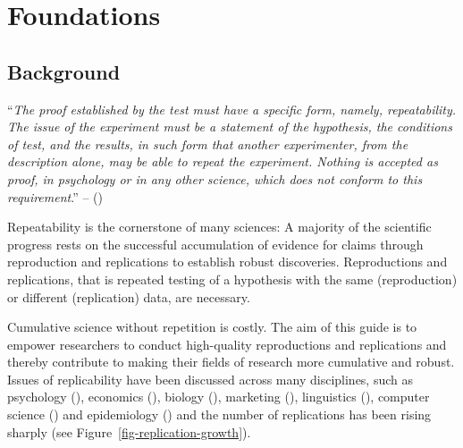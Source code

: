 \documentclass[
  letterpaper,
  DIV=11,
  openany,
  fontsize=12pt,
  parskip=half,
  headings=big,
  numbers=noenddot,
  titlepage=false]{scrreprt}
\begin{document}
\part{Foundations}

\chapter{Background}\label{background}

``\emph{The proof established by the test must have a specific form,
namely, repeatability. The issue of the experiment must be a statement
of the hypothesis, the conditions of test, and the results, in such form
that another experimenter, from the description alone, may be able to
repeat the experiment. Nothing is accepted as proof, in psychology or in
any other science, which does not conform to this requirement}.'' --
()

Repeatability is the cornerstone of many sciences: A majority of the
scientific progress rests on the successful accumulation of evidence for
claims through reproduction and replications to establish robust
discoveries. Reproductions and replications, that is repeated testing of
a hypothesis with the same (reproduction) or different (replication)
data, are necessary.

Cumulative science without repetition is costly. The aim of this guide
is to empower researchers to conduct high-quality reproductions and
replications and thereby contribute to making their fields of research
more cumulative and robust. Issues of replicability have been discussed
across many disciplines, such as psychology
(),
economics (), biology (), marketing (), linguistics (), computer science () and epidemiology () and the number of replications has been
rising sharply (see Figure~\ref{fig-replication-growth}).
\end{document}
